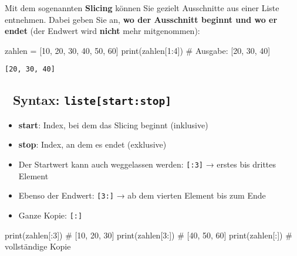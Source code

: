 \documentclass[
  letterpaper,
  DIV=11,
  numbers=noendperiod]{scrreprt}
\newenvironment{Shaded}{\begin{snugshade}}{\end{snugshade}}
\newcommand{\BuiltInTok}[1]{\textcolor[rgb]{0.00,0.23,0.31}{#1}}
\newcommand{\CommentTok}[1]{\textcolor[rgb]{0.37,0.37,0.37}{#1}}
\newcommand{\DecValTok}[1]{\textcolor[rgb]{0.68,0.00,0.00}{#1}}
\newcommand{\NormalTok}[1]{\textcolor[rgb]{0.00,0.23,0.31}{#1}}
\newcommand{\OperatorTok}[1]{\textcolor[rgb]{0.37,0.37,0.37}{#1}}
\providecommand{\tightlist}{%
  \setlength{\itemsep}{0pt}\setlength{\parskip}{0pt}}\usepackage{longtable,booktabs,array}
\begin{document}
Mit dem sogenannten \textbf{Slicing} können Sie gezielt Ausschnitte aus
einer Liste entnehmen. Dabei geben Sie an, \textbf{wo der Ausschnitt
beginnt und wo er endet} (der Endwert wird \textbf{nicht} mehr
mitgenommen):

\begin{Shaded}
\begin{Highlighting}[]
\NormalTok{zahlen }\OperatorTok{=}\NormalTok{ [}\DecValTok{10}\NormalTok{, }\DecValTok{20}\NormalTok{, }\DecValTok{30}\NormalTok{, }\DecValTok{40}\NormalTok{, }\DecValTok{50}\NormalTok{, }\DecValTok{60}\NormalTok{]}
\BuiltInTok{print}\NormalTok{(zahlen[}\DecValTok{1}\NormalTok{:}\DecValTok{4}\NormalTok{])  }\CommentTok{\# Ausgabe: [20, 30, 40]}
\end{Highlighting}
\end{Shaded}

\begin{verbatim}
[20, 30, 40]
\end{verbatim}

\subsection{\texorpdfstring{🔢 Syntax:
\texttt{liste{[}start:stop{]}}}{🔢 Syntax: liste{[}start:stop{]}}}\label{syntax-listestartstop}

\begin{itemize}
\tightlist
\item
  \textbf{start}: Index, bei dem das Slicing beginnt (inklusive)
\item
  \textbf{stop}: Index, an dem es endet (exklusive)
\item
  Der Startwert kann auch weggelassen werden: \texttt{{[}:3{]}} → erstes
  bis drittes Element
\item
  Ebenso der Endwert: \texttt{{[}3:{]}} → ab dem vierten Element bis zum
  Ende
\item
  Ganze Kopie: \texttt{{[}:{]}}
\end{itemize}

\begin{Shaded}
\begin{Highlighting}[]
\BuiltInTok{print}\NormalTok{(zahlen[:}\DecValTok{3}\NormalTok{])   }\CommentTok{\# [10, 20, 30]}
\BuiltInTok{print}\NormalTok{(zahlen[}\DecValTok{3}\NormalTok{:])   }\CommentTok{\# [40, 50, 60]}
\BuiltInTok{print}\NormalTok{(zahlen[:])    }\CommentTok{\# vollständige Kopie}
\end{Highlighting}
\end{Shaded}
\end{document}
